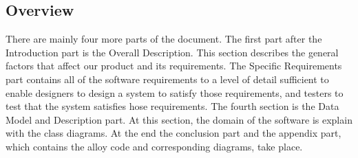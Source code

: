\subsection{Overview}
\quad There are mainly four more parts of the document. The first part after the Introduction part is the Overall Description. This section describes the general factors that affect our product and its requirements. The Specific Requirements part contains all of the software requirements to a level of detail sufficient to enable designers to design a system to satisfy those requirements, and testers to test that the system satisfies hose requirements. The fourth section is the Data Model and Description part. At this section, the domain of the software is explain with the class diagrams. At the end the conclusion part and the appendix part, which contains the alloy code and corresponding diagrams, take place.